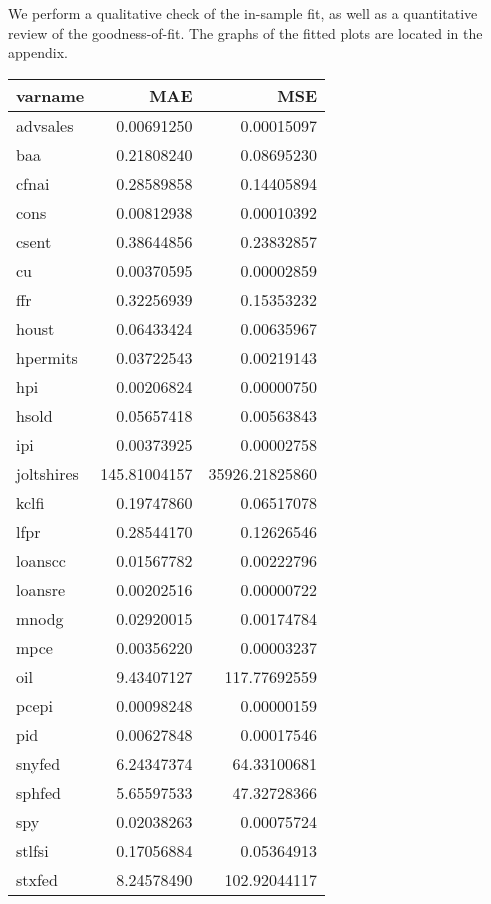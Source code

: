\documentclass[11pt, letterpaper]{article}\usepackage[]{graphicx}\usepackage[]{color}
\begin{document}
We perform a qualitative check of the in-sample fit, as well as a quantitative review of the goodness-of-fit. The graphs of the fitted plots are located in the appendix.
\begin{table}[H]
\centering
\begingroup\footnotesize
\begin{tabular}{lrr}
  \hline
varname & MAE & MSE \\ 
  \hline
advsales & 0.00691250 & 0.00015097 \\ 
  baa & 0.21808240 & 0.08695230 \\ 
  cfnai & 0.28589858 & 0.14405894 \\ 
  cons & 0.00812938 & 0.00010392 \\ 
  csent & 0.38644856 & 0.23832857 \\ 
  cu & 0.00370595 & 0.00002859 \\ 
  ffr & 0.32256939 & 0.15353232 \\ 
  houst & 0.06433424 & 0.00635967 \\ 
  hpermits & 0.03722543 & 0.00219143 \\ 
  hpi & 0.00206824 & 0.00000750 \\ 
  hsold & 0.05657418 & 0.00563843 \\ 
  ipi & 0.00373925 & 0.00002758 \\ 
  joltshires & 145.81004157 & 35926.21825860 \\ 
  kclfi & 0.19747860 & 0.06517078 \\ 
  lfpr & 0.28544170 & 0.12626546 \\ 
  loanscc & 0.01567782 & 0.00222796 \\ 
  loansre & 0.00202516 & 0.00000722 \\ 
  mnodg & 0.02920015 & 0.00174784 \\ 
  mpce & 0.00356220 & 0.00003237 \\ 
  oil & 9.43407127 & 117.77692559 \\ 
  pcepi & 0.00098248 & 0.00000159 \\ 
  pid & 0.00627848 & 0.00017546 \\ 
  snyfed & 6.24347374 & 64.33100681 \\ 
  sphfed & 5.65597533 & 47.32728366 \\ 
  spy & 0.02038263 & 0.00075724 \\ 
  stlfsi & 0.17056884 & 0.05364913 \\ 
  stxfed & 8.24578490 & 102.92044117 \\ 

\end{tabular}
\end{table}
\end{document}
